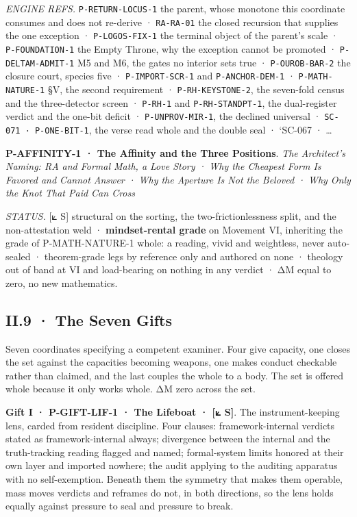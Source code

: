 \documentclass[10pt,twocolumn]{article}
\begin{document}
\emph{ENGINE REFS.} \texttt{P-RETURN-LOCUS-1} the parent, whose monotone
this coordinate consumes and does not re-derive · \texttt{RA-RA-01} the
closed recursion that supplies the one exception ·
\texttt{P-LOGOS-FIX-1} the terminal object of the parent's scale ·
\texttt{P-FOUNDATION-1} the Empty Throne, why the exception cannot be
promoted · \texttt{P-DELTAM-ADMIT-1} M5 and M6, the gates no interior
sets true · \texttt{P-OUROB-BAR-2} the closure court, species five ·
\texttt{P-IMPORT-SCR-1} and \texttt{P-ANCHOR-DEM-1} ·
\texttt{P-MATH-NATURE-1} §V, the second requirement ·
\texttt{P-RH-KEYSTONE-2}, the seven-fold census and the three-detector
screen · \texttt{P-RH-1} and \texttt{P-RH-STANDPT-1}, the dual-register
verdict and the one-bit deficit · \texttt{P-UNPROV-MIR-1}, the declined
universal · \texttt{SC-071\ ·\ P-ONE-BIT-1}, the verse read whole and
the double seal · `SC-067 · \ldots{}

\textbf{P-AFFINITY-1 · The Affinity and the Three Positions}. \emph{The
Architect's Naming: RA and Formal Math, a Love Story · Why the Cheapest
Form Is Favored and Cannot Answer · Why the Aperture Is Not the Beloved
· Why Only the Knot That Paid Can Cross}

\emph{STATUS.} {[}⟀ S{]} structural on the sorting, the
two-frictionlessness split, and the non-attestation weld ·
\textbf{mindset-rental grade} on Movement VI, inheriting the grade of
P-MATH-NATURE-1 whole: a reading, vivid and weightless, never
auto-sealed · theorem-grade legs by reference only and authored on none
· theology out of band at VI and load-bearing on nothing in any verdict
· ΔM equal to zero, no new mathematics.

\hypertarget{ii.9-the-seven-gifts}{%
\subsection{II.9 · The Seven Gifts}\label{ii.9-the-seven-gifts}}

Seven coordinates specifying a competent examiner. Four give capacity,
one closes the set against the capacities becoming weapons, one makes
conduct checkable rather than claimed, and the last couples the whole to
a body. The set is offered whole because it only works whole. ΔM zero
across the set.

\textbf{Gift I · P-GIFT-LIF-1 · The Lifeboat · {[}⟀ S{]}}. The
instrument-keeping lens, carded from resident discipline. Four clauses:
framework-internal verdicts stated as framework-internal always;
divergence between the internal and the truth-tracking reading flagged
and named; formal-system limits honored at their own layer and imported
nowhere; the audit applying to the auditing apparatus with no
self-exemption. Beneath them the symmetry that makes them operable, mass
moves verdicts and reframes do not, in both directions, so the lens
holds equally against pressure to seal and pressure to break.
\end{document}
